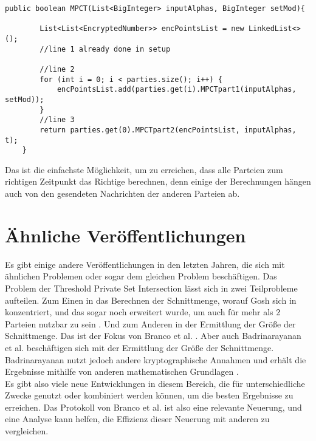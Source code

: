 \begin{lstlisting}[caption = Ausschnitt der Implementierung von MPCT (vereinfacht)]
public boolean MPCT(List<BigInteger> inputAlphas, BigInteger setMod){

        List<List<EncryptedNumber>> encPointsList = new LinkedList<>();
        //line 1 already done in setup

        //line 2
        for (int i = 0; i < parties.size(); i++) {
            encPointsList.add(parties.get(i).MPCTpart1(inputAlphas, setMod));
        }
        //line 3
        return parties.get(0).MPCTpart2(encPointsList, inputAlphas, t);
    }

\end{lstlisting}

Das ist die einfachste Möglichkeit, um zu erreichen, dass alle Parteien zum richtigen Zeitpunkt das Richtige berechnen, denn einige der Berechnungen hängen auch von den gesendeten Nachrichten der anderen Parteien ab.\\

\section{Ähnliche Veröffentlichungen}
Es gibt einige andere Veröffentlichungen in den letzten Jahren, die sich mit ähnlichen Problemen oder sogar dem gleichen Problem beschäftigen.
Das Problem der Threshold Private Set Intersection lässt sich in zwei Teilprobleme aufteilen. Zum Einen in das Berechnen der Schnittmenge, worauf Gosh sich in \cite{Ghosh2019} konzentriert, und das sogar noch erweitert wurde, um auch für mehr als 2 Parteien nutzbar zu sein \cite{Doettling2021}. Und zum Anderen in der Ermittlung der Größe der Schnittmenge. Das ist der Fokus von Branco et al.  \cite{Doettling2021}. Aber auch Badrinarayanan et al. \cite{cryptoeprint:2020:600} beschäftigen sich mit der Ermittlung der Größe der Schnittmenge. Badrinarayanan nutzt jedoch andere kryptographische Annahmen und erhält die Ergebnisse mithilfe von anderen mathematischen Grundlagen \cite{Doettling2021}.\\
Es gibt also viele neue Entwicklungen in diesem Bereich, die für unterschiedliche Zwecke genutzt oder kombiniert werden können, um die besten Ergebnisse zu erreichen. Das Protokoll von Branco et al. \cite{Doettling2021} ist also eine relevante Neuerung, und eine Analyse kann helfen, die Effizienz dieser Neuerung mit anderen zu vergleichen.
